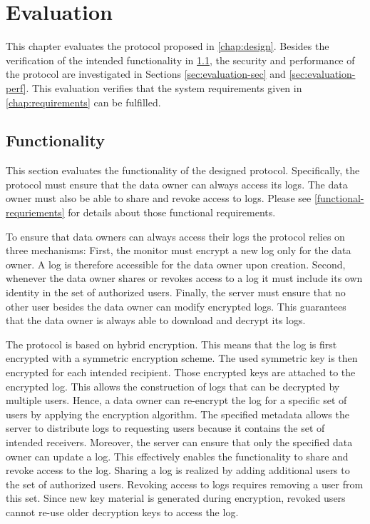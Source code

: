 \documentclass[../main.tex]{subfiles}
\begin{document}
\chapter{Evaluation}
\label{chap:evaluation}

This chapter evaluates the protocol proposed in \cref{chap:design}.
Besides the verification of the intended functionality in \cref{sec:evaluation-func}, the security and performance of the protocol are investigated in Sections \ref{sec:evaluation-sec} and \ref{sec:evaluation-perf}.
This evaluation verifies that the system requirements given in \cref{chap:requirements} can be fulfilled.

\section{Functionality}
\label{sec:evaluation-func}

This section evaluates the functionality of the designed protocol.
Specifically, the protocol must ensure that the data owner can always access its logs.
The data owner must also be able to share and revoke access to logs.
Please see \cref{functional-requriements} for details about those functional requirements.

To ensure that data owners can always access their logs the protocol relies on three mechanisms:
First, the monitor must encrypt a new log only for the data owner.
A log is therefore accessible for the data owner upon creation.
Second, whenever the data owner shares or revokes access to a log it must include its own identity in the set of authorized users.
Finally, the server must ensure that no other user besides the data owner can modify encrypted logs.
This guarantees that the data owner is always able to download and decrypt its logs.

The protocol is based on hybrid encryption.
This means that the log is first encrypted with a symmetric encryption scheme.
The used symmetric key is then encrypted for each intended recipient.
Those encrypted keys are attached to the encrypted log.
This allows the construction of logs that can be decrypted by multiple users.
Hence, a data owner can re-encrypt the log for a specific set of users by applying the encryption algorithm.
The specified metadata allows the server to distribute logs to requesting users because it contains the set of intended receivers.
Moreover, the server can ensure that only the specified data owner can update a log.
This effectively enables the functionality to share and revoke access to the log.
Sharing a log is realized by adding additional users to the set of authorized users.
Revoking access to logs requires removing a user from this set.
Since new key material is generated during encryption, revoked users cannot re-use older decryption keys to access the log.
\end{document}
